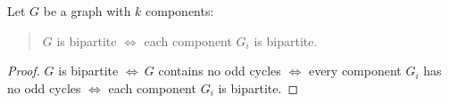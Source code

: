\documentclass[letterpaper,12pt,fleqn]{article}
\begin{document}
\begin{corollary}
  Let \(G\) be a graph with \(k\) components:
  \begin{quote}
    \(G\) is bipartite \(\iff\) each component \(G_i\) is bipartite.
  \end{quote}
\end{corollary}

\begin{proof}
  \(G\) is bipartite \(\iff\ G\) contains no odd cycles \(\iff\) every component \(G_i\) has no odd cycles
  \(\iff\) each component \(G_i\) is bipartite.
\end{proof}
\end{document}
